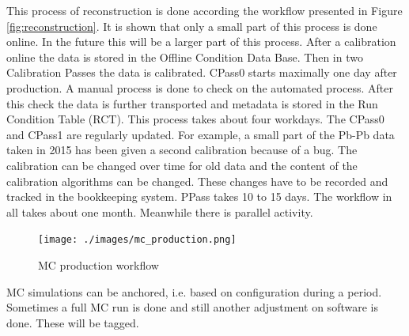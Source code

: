 This process of reconstruction is done according the workflow presented in Figure \ref{fig:reconstruction}. It is shown that only a small part of this process is done online. In the future this will be a larger part of this process. After a calibration online the data is stored in the Offline Condition Data Base. Then in two Calibration Passes the data is calibrated. CPass0 starts maximally one day after production. A manual process is done to check on the automated process. After this check the data is further transported and metadata is stored in the Run Condition Table (RCT). This process takes about four workdays. The CPass0 and CPass1 are regularly updated. For example, a small part of the Pb-Pb data taken in 2015 has been given a second calibration because of a bug. The calibration can be changed over time for old data and the content of the calibration algorithms can be changed. These changes have to be recorded and tracked in the bookkeeping system. PPass takes 10 to 15 days. The workflow in all takes about one month. Meanwhile there is parallel activity.

\begin{figure}[h]
  \begin{center}
    \texttt{[image: ./images/mc\_production.png]}
    \caption{MC production workflow}
    \label{fig:}
  \end{center}
\end{figure}

MC simulations can be anchored, i.e. based on configuration during a period. Sometimes a full MC run is done and still another adjustment on software is done. These will be tagged. 

